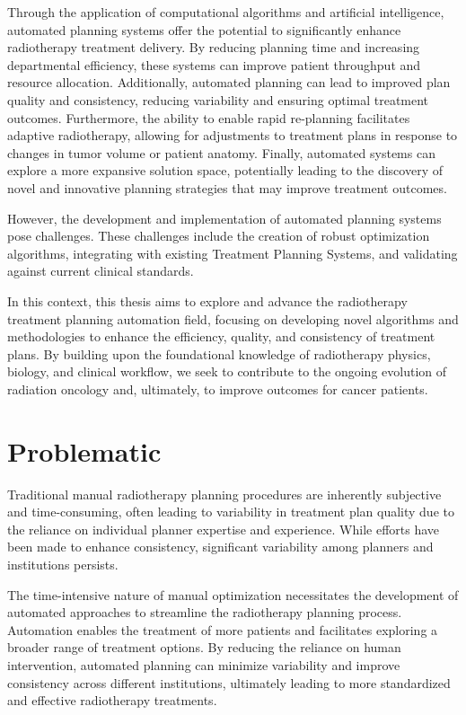 Through the application of computational algorithms and artificial intelligence, automated planning systems offer the potential to significantly enhance radiotherapy treatment delivery.
By reducing planning time and increasing departmental efficiency, these systems can improve patient throughput and resource allocation.
Additionally, automated planning can lead to improved plan quality and consistency, reducing variability and ensuring optimal treatment outcomes.
Furthermore, the ability to enable rapid re-planning facilitates adaptive radiotherapy, allowing for adjustments to treatment plans in response to changes in tumor volume or patient anatomy.
Finally, automated systems can explore a more expansive solution space, potentially leading to the discovery of novel and innovative planning strategies that may improve treatment outcomes.

However, the development and implementation of automated planning systems pose challenges.
These challenges include the creation of robust optimization algorithms, integrating with existing Treatment Planning Systems, and validating against current clinical standards.

In this context, this thesis aims to explore and advance the radiotherapy treatment planning automation field, focusing on developing novel algorithms and methodologies to enhance the efficiency, quality, and consistency of treatment plans.
By building upon the foundational knowledge of radiotherapy physics, biology, and clinical workflow, we seek to contribute to the ongoing evolution of radiation oncology and, ultimately, to improve outcomes for cancer patients.

\section{Problematic}
Traditional manual radiotherapy planning procedures are inherently subjective and time-consuming, often leading to variability in treatment plan quality due to the reliance on individual planner expertise and experience.
While efforts have been made to enhance consistency, significant variability among planners and institutions persists.

The time-intensive nature of manual optimization necessitates the development of automated approaches to streamline the radiotherapy planning process.
Automation enables the treatment of more patients and facilitates exploring a broader range of treatment options.
By reducing the reliance on human intervention, automated planning can minimize variability and improve consistency across different institutions, ultimately leading to more standardized and effective radiotherapy treatments.


